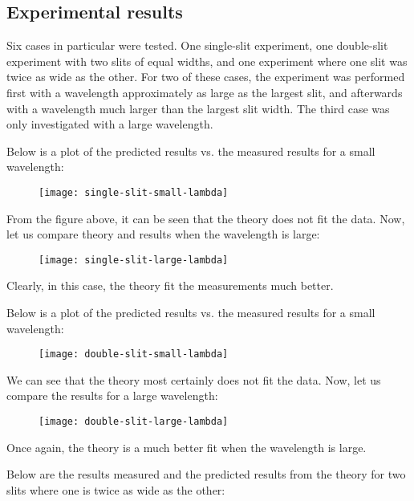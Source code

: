 \documentclass{paper}
\begin{document}
\subsection{Experimental results}

Six cases in particular were tested. One single-slit experiment, one double-slit
experiment with two slits of equal widths, and one experiment where one slit was twice
as wide as the other. For two of these cases, the experiment was performed first with
a wavelength approximately as large as the largest slit, and afterwards with a wavelength much
larger than the largest slit width. The third case was only investigated with a large wavelength.

Below is a plot of the predicted results vs. the measured results for a small wavelength:

\begin{figure}[H]
\label{fig:single-slit-small-lambda}
    \texttt{[image: single-slit-small-lambda]}

\end{figure}
From the figure above, it can be seen that the theory does not fit the data.
Now, let us compare theory and results when the wavelength is large:

\begin{figure}[H]
\label{fig:single-slit-large-lambda}
    \texttt{[image: single-slit-large-lambda]}
\end{figure} 

Clearly, in this case, the theory fit the measurements much better.

Below is a plot of the predicted results vs. the measured results for a small wavelength:

\begin{figure}[H]
\label{fig:double-slit-small-lambda}
    \texttt{[image: double-slit-small-lambda]}
\end{figure}

We can see that the theory most certainly does not fit the data.
Now, let us compare the results for a large wavelength:

\begin{figure}[H]
\label{fig:double-slit-large-lambda}
    \texttt{[image: double-slit-large-lambda]}
\end{figure}

Once again, the theory is a much better fit when the wavelength is
large.

Below are the results measured and the predicted results from the theory
for two slits where one is twice as wide as the other:
\end{document}
